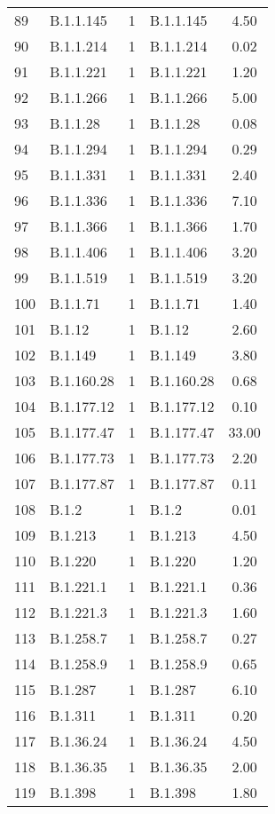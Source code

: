 \begin{longtable}{llcp{4cm}c}
  89 & B.1.1.145 &   1 & B.1.1.145 & 4.50 \\ 
  90 & B.1.1.214 &   1 & B.1.1.214 & 0.02 \\ 
  91 & B.1.1.221 &   1 & B.1.1.221 & 1.20 \\ 
  92 & B.1.1.266 &   1 & B.1.1.266 & 5.00 \\ 
  93 & B.1.1.28 &   1 & B.1.1.28 & 0.08 \\ 
  94 & B.1.1.294 &   1 & B.1.1.294 & 0.29 \\ 
  95 & B.1.1.331 &   1 & B.1.1.331 & 2.40 \\ 
  96 & B.1.1.336 &   1 & B.1.1.336 & 7.10 \\ 
  97 & B.1.1.366 &   1 & B.1.1.366 & 1.70 \\ 
  98 & B.1.1.406 &   1 & B.1.1.406 & 3.20 \\ 
  99 & B.1.1.519 &   1 & B.1.1.519 & 3.20 \\ 
  100 & B.1.1.71 &   1 & B.1.1.71 & 1.40 \\ 
  101 & B.1.12 &   1 & B.1.12 & 2.60 \\ 
  102 & B.1.149 &   1 & B.1.149 & 3.80 \\ 
  103 & B.1.160.28 &   1 & B.1.160.28 & 0.68 \\ 
  104 & B.1.177.12 &   1 & B.1.177.12 & 0.10 \\ 
  105 & B.1.177.47 &   1 & B.1.177.47 & 33.00 \\ 
  106 & B.1.177.73 &   1 & B.1.177.73 & 2.20 \\ 
  107 & B.1.177.87 &   1 & B.1.177.87 & 0.11 \\ 
  108 & B.1.2 &   1 & B.1.2 & 0.01 \\ 
  109 & B.1.213 &   1 & B.1.213 & 4.50 \\ 
  110 & B.1.220 &   1 & B.1.220 & 1.20 \\ 
  111 & B.1.221.1 &   1 & B.1.221.1 & 0.36 \\ 
  112 & B.1.221.3 &   1 & B.1.221.3 & 1.60 \\ 
  113 & B.1.258.7 &   1 & B.1.258.7 & 0.27 \\ 
  114 & B.1.258.9 &   1 & B.1.258.9 & 0.65 \\ 
  115 & B.1.287 &   1 & B.1.287 & 6.10 \\ 
  116 & B.1.311 &   1 & B.1.311 & 0.20 \\ 
  117 & B.1.36.24 &   1 & B.1.36.24 & 4.50 \\ 
  118 & B.1.36.35 &   1 & B.1.36.35 & 2.00 \\ 
  119 & B.1.398 &   1 & B.1.398 & 1.80 \\ 

\end{longtable}
